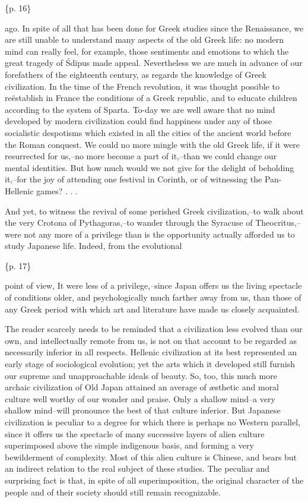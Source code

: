 \{p. 16\}

ago. In spite of all that has been done for Greek studies since the Renaissance, we are still unable to understand many aspects of the old Greek life: no modern mind can really feel, for example, those sentiments and emotions to which the great tragedy of Śdipus made appeal. Nevertheless we are much in advance of our forefathers of the eighteenth century, as regards the knowledge of Greek civilization. In the time of the French revolution, it was thought possible to reëstablish in France the conditions of a Greek republic, and to educate children according to the system of Sparta. To-day we are well aware that no mind developed by modern civilization could find happiness under any of those socialistic despotisms which existed in all the cities of the ancient world before the Roman conquest. We could no more mingle with the old Greek life, if it were resurrected for us,--no more become a part of it,--than we could change our mental identities. But how much would we not give for the delight of beholding it,--for the joy of attending one festival in Corinth, or of witnessing the Pan-Hellenic games? . . .

And yet, to witness the revival of some perished Greek civilization,--to walk about the very Crotona of Pythagoras,--to wander through the Syracuse of Theocritus,--were not any more of a privilege than is the opportunity actually afforded us to study Japanese life. Indeed, from the evolutional

\{p. 17\}

point of view, It were less of a privilege,--since Japan offers us the living spectacle of conditions older, and psychologically much farther away from us, than those of any Greek period with which art and literature have made us closely acquainted.

The reader scarcely needs to be reminded that a civilization less evolved than our own, and intellectually remote from us, is not on that account to be regarded as necessarily inferior in all respects. Hellenic civilization at its best represented an early stage of sociological evolution; yet the arts which it developed still furnish our supreme and unapproachable ideals of beauty. So, too, this much more archaic civilization of Old Japan attained an average of æsthetic and moral culture well worthy of our wonder and praise. Only a shallow mind--a very shallow mind--will pronounce the best of that culture inferior. But Japanese civilization is peculiar to a degree for which there is perhaps no Western parallel, since it offers us the spectacle of many successive layers of alien culture superimposed above the simple indigenous basis, and forming a very bewilderment of complexity. Most of this alien culture is Chinese, and bears but an indirect relation to the real subject of these studies. The peculiar and surprising fact is that, in spite of all superimposition, the original character of the people and of their society should still remain recognizable.

